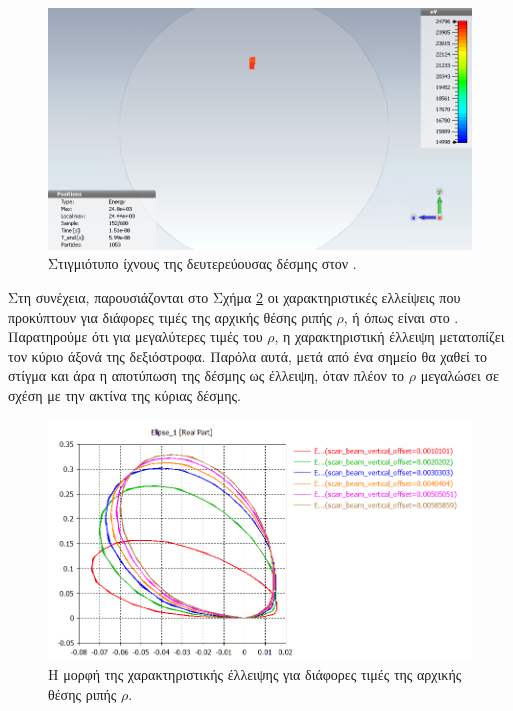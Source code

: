 \begin{figure}[tbh]
	\includegraphics[width=\textwidth]{figures/CST-EBS-implementation/CST-EBS-2D-monitor-snapshot}
	\centering
	\caption{Στιγμιότυπο ίχνους της δευτερεύουσας δέσμης στον .}
	\label{fig:CST-EBS-2D-monitor-snapshot}
\end{figure}

Στη συνέχεια, παρουσιάζονται στο Σχήμα \ref{fig:CST-EBS-ellipses} οι χαρακτηριστικές ελλείψεις που προκύπτουν για διάφορες τιμές της αρχικής θέσης ριπής $\rho$, ή  όπως είναι στο .
Παρατηρούμε ότι για μεγαλύτερες τιμές του $\rho$, η χαρακτηριστική έλλειψη μετατοπίζει τον κύριο άξονά της δεξιόστροφα. 
Παρόλα αυτά, μετά από ένα σημείο θα χαθεί το στίγμα και άρα η αποτύπωση της δέσμης ως έλλειψη, όταν πλέον το $\rho$ μεγαλώσει σε σχέση με την ακτίνα της κύριας δέσμης.

\begin{figure}[tbh]
	\includegraphics[width=\textwidth]{figures/CST-EBS-implementation/CST-EBS-ellipses}
	\centering
	\caption{Η μορφή της χαρακτηριστικής έλλειψης για διάφορες τιμές της αρχικής θέσης ριπής $\rho$.}
	\label{fig:CST-EBS-ellipses}
\end{figure}

